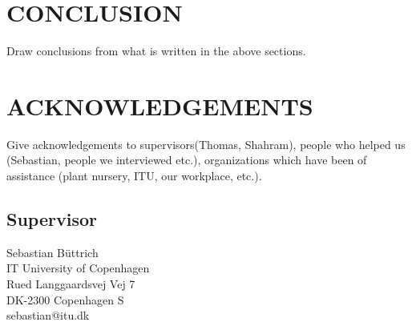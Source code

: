 \documentclass{ubicomp2012}
\begin{document}
\section{CONCLUSION}
Draw conclusions from what is written in the above sections.

\section{ACKNOWLEDGEMENTS}
Give acknowledgements to supervisors(Thomas, Shahram), people who helped us (Sebastian, people we interviewed etc.), organizations which have been of assistance (plant nursery, ITU, our workplace, etc.).

\subsection{Supervisor}
Sebastian B\"uttrich\\
IT University of Copenhagen\\
Rued Langgaardsvej Vej 7\\
DK-2300 Copenhagen S\\
sebastian@itu.dk


\vfill\eject




\end{document}

